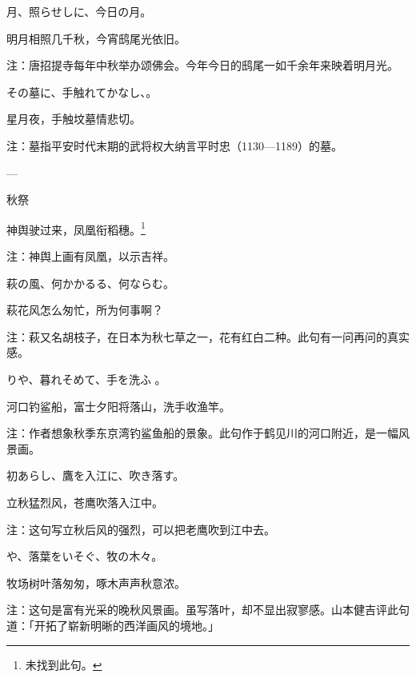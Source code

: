 \begin{haiku}
    {\FH 月、照らせしに、今日の月。}

    {\FK 明月相照几千秋，今宵鸱尾光依旧。}

    {\FT 注：唐招提寺每年中秋举办颂佛会。今年今日的鸱尾一如千余年来映着明月光。}
\end{haiku}

\begin{haiku}
    {\FH その墓に、手触れてかなし、。}

    {\FK 星月夜，手触坟墓情悲切。}

    {\FT 注：墓指平安时代末期的武将权大纳言平时忠（1130—1189）的墓。}
\end{haiku}

\begin{haiku}
    {\FH ---}

    {\FK 秋祭}

    {\FK 神舆驶过来，凤凰衔稻穗。\footnote{\FT 未找到此句。}}

    {\FT 注：神舆上画有凤凰，以示吉祥。}
\end{haiku}

\begin{haiku}
    {\FH 萩の風、何かかるる、何ならむ。}

    {\FK 萩花风怎么匆忙，所为何事啊？}

    {\FT 注：萩又名胡枝子，在日本为秋七草之一，花有红白二种。此句有一问再问的真实感。}
\end{haiku}

\begin{haiku}
    {\FH {}りや、暮れそめて、手を洗ふ 。}

    {\FK 河口钓鲨船，富士夕阳将落山，洗手收渔竿。}

    {\FT 注：作者想象秋季东京湾钓鲨鱼船的景象。此句作于鹤见川的河口附近，是一幅风景画。}
\end{haiku}

\begin{haiku}
    {\FH 初あらし、鷹を入江に、吹き落す。}

    {\FK 立秋猛烈风，苍鹰吹落入江中。}

    {\FT 注：这句写立秋后风的强烈，可以把老鹰吹到江中去。}
\end{haiku}

\begin{haiku}
    {\FH {}や、落葉をいそぐ、牧の木々。}

    {\FK 牧场树叶落匆匆，啄木声声秋意浓。}

    {\FT 注：这句是富有光采的晚秋风景画。虽写落叶，却不显出寂寥感。山本健吉评此句道：「开拓了崭新明晰的西洋画风的境地。」}
\end{haiku}

